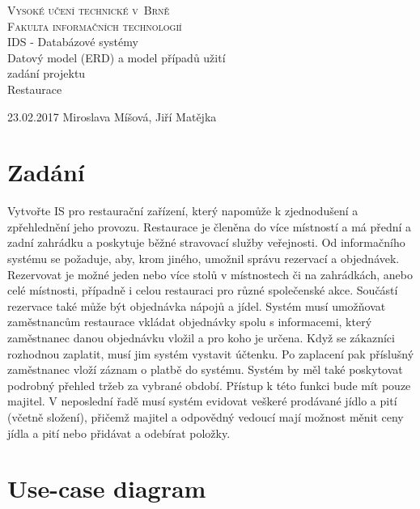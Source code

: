 \documentclass[11pt, a4paper]{article}[]
\begin{document}
	\thispagestyle{empty}

	\begin{center}
		\Huge
			\textsc{Vysoké učení technické v~Brně\\}
		\huge
			\textsc{Fakulta informačních technologií\\}
		\LARGE
			IDS - Databázové systémy \\
		\Huge
			Datový model (ERD) a model případů užití \\
			zadání projektu\\
			Restaurace \\
	\end{center}
		{\Large 23.02.2017 \hfill Miroslava Míšová, Jiří Matějka} %


	\pagebreak  %
	\setcounter{page}{1}  %


	\section{Zadání}
	Vytvořte IS pro restaurační zařízení, který napomůže k zjednodušení a zpřehlednění jeho provozu. Restaurace je členěna do více místností a má přední a zadní zahrádku a poskytuje běžné stravovací služby veřejnosti. Od informačního systému se požaduje, aby, krom jiného, umožnil správu rezervací a objednávek. Rezervovat je možné jeden nebo více stolů v místnostech či na zahrádkách, anebo celé místnosti, případně i celou restauraci pro různé společenské akce. Součástí rezervace také může být objednávka nápojů a jídel. Systém musí umožňovat zaměstnancům restaurace vkládat objednávky spolu s informacemi, který zaměstnanec danou objednávku vložil a pro koho je určena. Když se zákazníci rozhodnou zaplatit, musí jim systém vystavit účtenku. Po zaplacení pak příslušný zaměstnanec vloží záznam o platbě do systému. Systém by měl také poskytovat podrobný přehled tržeb za vybrané období. Přístup k této funkci bude mít pouze majitel. V neposlední řadě musí systém evidovat veškeré prodávané jídlo a pití (včetně složení), přičemž majitel a odpovědný vedoucí mají možnost měnit ceny jídla a pití nebo přidávat a odebírat položky. 
	

	\section{Use-case diagram}  
\end{document}
